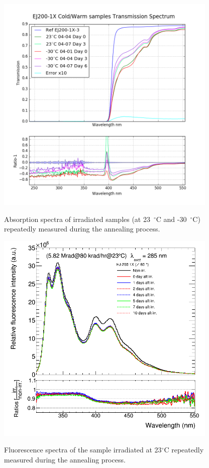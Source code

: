 \documentclass[review]{elsarticle}
\begin{document}
\begin{figure}[!ht]
	\centering
	\caption{Absorption spectra of irradiated samples (at 23~$^\circ$C and -30~$^\circ$C) repeatedly measured during the annealing process.}
	\includegraphics[width=300pt]{./figures/abs.png}
	\label{fig:abs}
\end{figure}

\begin{figure}[!ht]
	\centering
	\caption{Fluorescence spectra of the sample irradiated at 23$^\circ$C repeatedly measured during the annealing process.}
	\includegraphics[width=300pt]{./figures/appendix1.png}
	\label{fig:app1}
\end{figure}
\end{document}
